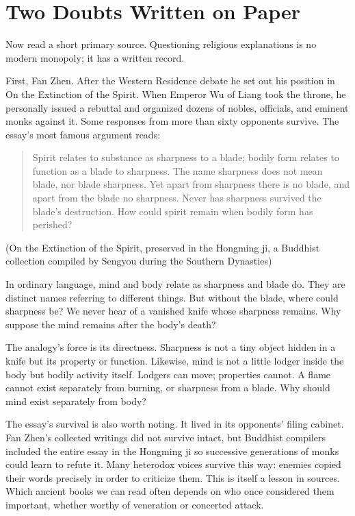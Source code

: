 \section{Two Doubts Written on Paper}
Now read a short primary source. Questioning religious explanations is no modern monopoly; it has a written record.

First, Fan Zhen. After the Western Residence debate he set out his position in On the Extinction of the Spirit. When Emperor Wu of Liang took the throne, he personally issued a rebuttal and organized dozens of nobles, officials, and eminent monks against it. Some responses from more than sixty opponents survive. The essay's most famous argument reads:

\begin{quote}
Spirit relates to substance as sharpness to a blade; bodily form relates to function as a blade to sharpness. The name sharpness does not mean blade, nor blade sharpness. Yet apart from sharpness there is no blade, and apart from the blade no sharpness. Never has sharpness survived the blade's destruction. How could spirit remain when bodily form has perished?
\end{quote}
(On the Extinction of the Spirit, preserved in the Hongming ji, a Buddhist collection compiled by Sengyou during the Southern Dynasties)

In ordinary language, mind and body relate as sharpness and blade do. They are distinct names referring to different things. But without the blade, where could sharpness be? We never hear of a vanished knife whose sharpness remains. Why suppose the mind remains after the body's death?

The analogy's force is its directness. Sharpness is not a tiny object hidden in a knife but its property or function. Likewise, mind is not a little lodger inside the body but bodily activity itself. Lodgers can move; properties cannot. A flame cannot exist separately from burning, or sharpness from a blade. Why should mind exist separately from body?

The essay's survival is also worth noting. It lived in its opponents' filing cabinet. Fan Zhen's collected writings did not survive intact, but Buddhist compilers included the entire essay in the Hongming ji so successive generations of monks could learn to refute it. Many heterodox voices survive this way: enemies copied their words precisely in order to criticize them. This is itself a lesson in sources. Which ancient books we can read often depends on who once considered them important, whether worthy of veneration or concerted attack.

